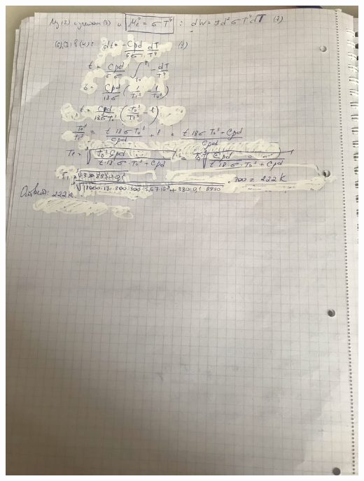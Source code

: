 \documentclass[12pt]{article}
\begin{document}
\begin{center}
\includegraphics[scale=0.5]{1_2.jpeg}\\
\end{center}
\end{document}

